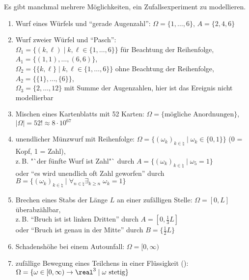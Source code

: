 \begin{Bsp}
    Es gibt manchmal mehrere Möglichkeiten, ein Zufallsexperiment zu modellieren.
    \begin{enumerate}
        \item
        Wurf eines Würfels und "`gerade Augenzahl"':
        $\Omega = \{1, \dotsc, 6\}$, $A = \{2, 4, 6\}$
        
        \item
        Wurf zweier Würfel und "`Pasch"':\\
        $\Omega_1 = \{(k, \ell) \;|\; k, \ell \in \{1, \dotsc, 6\}\}$
        für Beachtung der Reihenfolge, $A_1 = \{(1, 1), \dotsc, (6, 6)\}$,\\
        $\Omega_2 = \{\{k, \ell\} \;|\; k, \ell \in \{1, \dotsc, 6\}\}$
        ohne Beachtung der Reihenfolge, $A_2 = \{\{1\}, \dotsc, \{6\}\}$,\\
        $\Omega_3 = \{2, \dotsc, 12\}$ mit Summe der Augenzahlen,
        hier ist das Ereignis nicht modellierbar
        
        \item
        Mischen eines Kartenblatts mit 52 Karten:
        $\Omega = \{\text{mögliche Anordnungen}\}$,\\
        $|\Omega| = 52! \approx 8 \cdot 10^{67}$
        
        \item
        unendlicher Münzwurf mit Reihenfolge:
        $\Omega = \{(\omega_k)_{k \in \natural} \;|\; \omega_k \in \{0, 1\}\}$
        (0 = Kopf, 1 = Zahl),\\
        z.\,B. "`der fünfte Wurf ist Zahl"` durch
        $A = \{(\omega_k)_{k \in \natural} \;|\; \omega_5 = 1\}$\\
        oder "`es wird unendlich oft Zahl geworfen"' durch
        $B = \{(\omega_k)_{k \in \natural} \;|\;
        \forall_{n \in \natural} \exists_{k \ge n}\; \omega_k = 1\}$
        
        \item
        Brechen eines Stabs der Länge $L$ an einer zufälligen Stelle:
        $\Omega = [0, L]$ überabzählbar,\\
        z.\,B. "`Bruch ist ist linken Dritten"' durch $A = [0, \frac{1}{3} L]$\\
        oder "`Bruch ist genau in der Mitte"' durch $B = \{\frac{1}{2} L\}$
        
        \item
        Schadenshöhe bei einem Autounfall:
        $\Omega = [0, \infty)$
        
        \item
        zufällige Bewegung eines Teilchens in einer Flüssigkeit ():\\
        $\Omega = \{\omega \in [0, \infty) \rightarrow \real^3 \;|\; \omega \text{ stetig}\}$
    \end{enumerate}
\end{Bsp}

